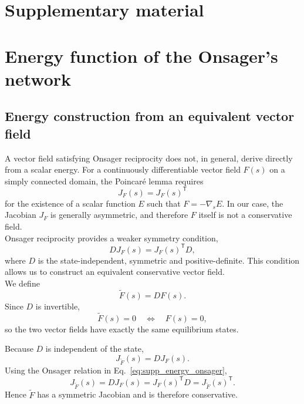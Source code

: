 \documentclass{article}
\begin{document}
\clearpage




\clearpage
\appendix
{}
\section*{Supplementary material}

\section{Energy function of the Onsager's network}
\label{sec:supp_onsager_energy}
\subsection{Energy construction from an equivalent vector field}

A vector field satisfying Onsager reciprocity does not, in general, derive
directly from a scalar energy. For a continuously differentiable
vector field $F(s)$ on a simply connected domain, the Poincar\'e lemma
requires
\begin{equation}
J_F(s)=J_F(s)^{\mathsf T}
\end{equation}
for the existence of a scalar function $E$ such that
$F=-\nabla_s E$. In our case, the Jacobian $J_F$ is generally asymmetric,
and therefore $F$ itself is not a conservative field.
\\
Onsager reciprocity provides a weaker symmetry condition,
\begin{equation}
D J_F(s)=J_F(s)^{\mathsf T}D,
\label{eq:supp_energy_onsager}
\end{equation}
where $D$ is the state-independent, symmetric and positive-definite. This condition allows us
to construct an equivalent conservative vector field.
\\
We define
\begin{equation}
\widetilde F(s)=D F(s).
\label{eq:supp_energy_transformed_field}
\end{equation}
Since $D$ is invertible,
\begin{equation}
\widetilde F(s)=0
\quad\Longleftrightarrow\quad
F(s)=0,
\label{eq:supp_energy_same_equilibria}
\end{equation}
so the two vector fields have exactly the same equilibrium states.

Because $D$ is independent of the state,
\begin{equation}
J_{\widetilde F}(s)
=
D J_F(s).
\end{equation}
Using the Onsager relation in
Eq.~\eqref{eq:supp_energy_onsager},
\begin{equation}
J_{\widetilde F}(s)
=
D J_F(s)
=
J_F(s)^{\mathsf T}D
=
J_{\widetilde F}(s)^{\mathsf T}.
\end{equation}
Hence $\widetilde F$ has a symmetric Jacobian and is therefore conservative.
\end{document}
